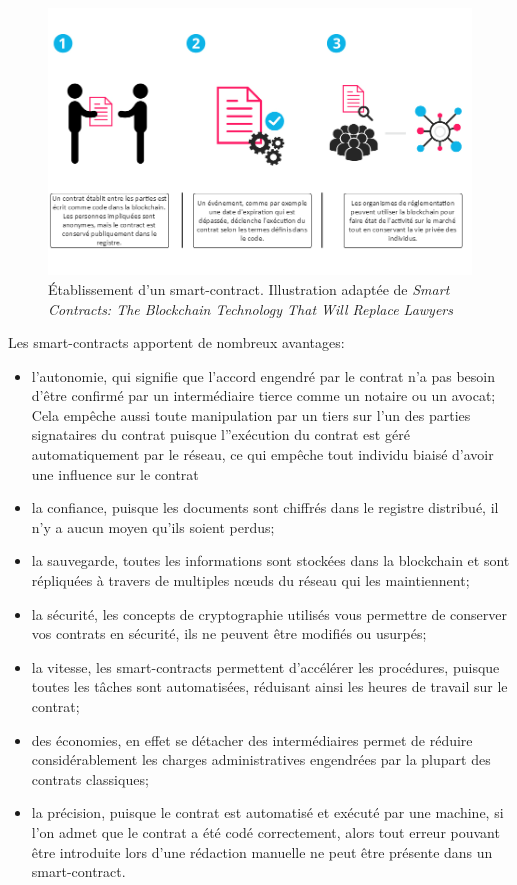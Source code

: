 \documentclass{tnreport}
\begin{document}
\begin{figure}[h]
	\centering
	\includegraphics[scale=0.53]{figures/smart-contracts}
	\caption{Établissement d'un smart-contract. Illustration adaptée de \textit{Smart Contracts: The Blockchain Technology That Will Replace Lawyers}~\cite{smart-contracts}}
	\label{fig:smart-contracts}
\end{figure}

Les smart-contracts apportent de nombreux avantages:
\begin{itemize}
	\item l'autonomie, qui signifie que l'accord engendré par le contrat n'a pas besoin d'être confirmé par un intermédiaire tierce comme un notaire ou un avocat; Cela empêche aussi toute manipulation par un tiers sur l'un des parties signataires du contrat puisque l''exécution du contrat est géré automatiquement par le réseau, ce qui empêche tout individu biaisé d'avoir une influence sur le contrat
	\item la confiance, puisque les documents sont chiffrés dans le registre distribué, il n'y a aucun moyen qu'ils soient perdus;
	\item la sauvegarde, toutes les informations sont stockées dans la blockchain et sont répliquées à travers de multiples nœuds du réseau qui les maintiennent;
	\item la sécurité, les concepts de cryptographie utilisés vous permettre de conserver vos contrats en sécurité, ils ne peuvent être modifiés ou usurpés;
	\item la vitesse, les smart-contracts permettent d'accélérer les procédures, puisque toutes les tâches sont automatisées, réduisant ainsi les heures de travail sur le contrat;
	\item des économies, en effet se détacher des intermédiaires permet de réduire considérablement les charges administratives engendrées par la plupart des contrats classiques;
	\item la précision, puisque le contrat est automatisé et exécuté par une machine, si l'on admet que le contrat a été codé correctement, alors tout erreur pouvant être introduite lors d'une rédaction manuelle ne peut être présente dans un smart-contract.
\end{itemize}
\end{document}
